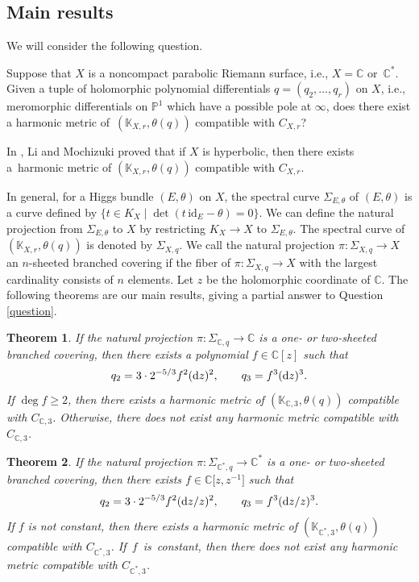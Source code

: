 \documentclass[pdftex]{sigma}
\numberwithin{equation}{section}
\newtheorem{Theorem}{Theorem}[section]
\newcommand{\C}{\mathbb{C}}
\newcommand{\ps}{\mathbb{P}}
\newcommand{\id}{\mathrm{id}}
\begin{document}
\subsection{Main results}
We will consider the following question.
\begin{Question}\label{question}
 Suppose that $X$ is a noncompact parabolic Riemann surface, i.e., $X=\C$ or~$\C^*$.
 Given a tuple of holomorphic polynomial differentials $q=(q_2,\dots,q_r)$ on $X$, i.e., meromorphic differentials on $\ps^1$ which have a possible pole at $\infty$, does there exist a harmonic metric of~$(\mathbb{K}_{X,r},\theta(q))$ compatible with $C_{X,r}$?
\end{Question}
\begin{Remark}
In \cite{LM2}, Li and Mochizuki proved that if $X$ is hyperbolic, then there exists a~harmonic metric of $(\mathbb{K}_{X,r},\theta(q))$ compatible with $C_{X,r}$.
\end{Remark}
In general, for a Higgs bundle $(E,\theta)$ on $X$, the spectral curve $\Sigma_{E,\theta}$ of $(E,\theta)$ is a curve defined by $\{ t\in K_{X} \mid \det(t\,\id_E -\theta)=0\}$. We can define the natural projection from $\Sigma_{E,\theta}$ to $X$ by restricting $K_X\to X$ to $\Sigma_{E,\theta}$. The spectral curve of $(\mathbb{K}_{X,r},\theta(q))$ is denoted by $\Sigma_{X,q}$. We call the natural projection $\pi\colon \Sigma_{X,q}\to X$ an $n$-sheeted branched covering if the fiber of $\pi\colon \Sigma_{X,q}\to X$ with the largest cardinality consists of $n$ elements. Let $z$ be the holomorphic coordinate of $\C$. The following theorems are our main results, giving a partial answer to Question \ref{question}.
\begin{Theorem}\label{main}
 If the natural projection $\pi\colon \Sigma_{\C,q}\to \C$ is a one- or two-sheeted branched covering, then there exists a polynomial $f\in \C[z]$ such that
 \begin{equation*}
 q_2 = 3\cdot 2^{-5/3}f^2 ({\rm d}z)^2, \qquad q_3 = f^3 ({\rm d}z)^3.
 \end{equation*}
 If $\deg{f}\geq 2$, then there exists a harmonic metric of $(\mathbb{K}_{\C,3},\theta(q))$ compatible with $C_{\C,3}$. Otherwise, there does not exist any harmonic metric compatible with $C_{\C,3}$.
\end{Theorem}
\begin{Theorem}\label{main_Cstar}
 If the natural projection $\pi\colon \Sigma_{\C^*,q}\to \C^*$ is a one- or two-sheeted branched covering, then there exists $f\in \C\bigl[z,z^{-1}\bigr]$ such that
 \begin{equation*}
 q_2 = 3\cdot 2^{-5/3}f^2 ({\rm d}z/z)^2, \qquad q_3 = f^3 ({\rm d}z/z)^3.
 \end{equation*}
 If $f$ is not constant, then there exists a harmonic metric of $(\mathbb{K}_{\C^*,3},\theta(q))$ compatible with $C_{\C^*,3}$. If~$f$~is~constant, then there does not exist any harmonic metric compatible with $C_{\C^*,3}$.
\end{Theorem}
\end{document}

